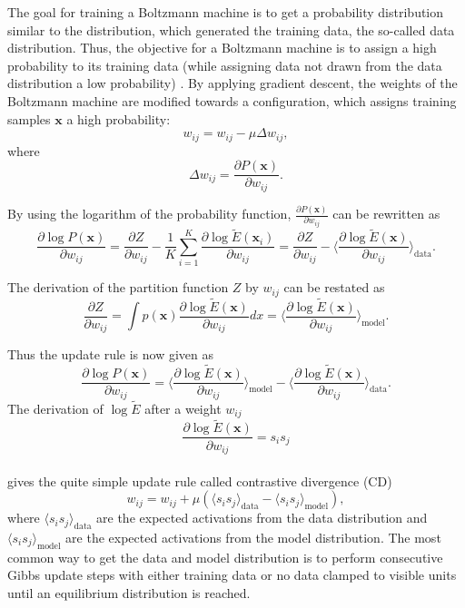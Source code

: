 The goal for training a Boltzmann machine is to get a probability distribution similar to the distribution, which generated the training data, the so-called data distribution.
Thus, the objective for a Boltzmann machine is to assign a high probability to its training data (while assigning data not drawn from the data distribution a low probability) \cite{ackley1985learning, Bengio2009, hinton2002training, Woodford2002}.
By applying gradient descent, the weights of the Boltzmann machine are modified towards a configuration, which assigns training samples $\textbf{x}$ a high probability:
\[
w_{ij} = w_{ij} - \mu \Delta w_{ij},
\]
where
\[
\Delta w_{ij} = \frac{\partial P(\textbf{x})}{\partial w_{ij}}.
\]

By using the logarithm of the probability function, $\frac{\partial P(\textbf{x})}{\partial w_{ij}}$ can be rewritten as
\[
\frac{\partial \log P(\textbf{x})}{\partial w_{ij}} = \frac{\partial Z}{\partial w_{ij}} - \frac{1}{K} \sum_{i=1}^K \frac{\partial \log \tilde{E}(\textbf{x}_i)}{\partial w_{ij}} =  \frac{\partial Z}{\partial w_{ij}} - \Big \langle \frac{\partial \log \tilde{E}(\textbf{x})}{\partial w_{ij}} \Big \rangle_{\text{data}}.
\]    

The derivation of the partition function $Z$ by $w_{ij}$ can be restated as
\[
 \frac{\partial Z}{\partial w_{ij}} = \int p(\textbf{x}) \frac{\partial \log \tilde{E}(\textbf{x})}{\partial w_{ij}} dx = \Big \langle \frac{\partial \log \tilde{E}(\textbf{x})}{\partial w_{ij}} \Big \rangle_{\text{model}}.
\]

Thus the update rule is now given as
\[
\frac{\partial \log P(\textbf{x})}{\partial w_{ij}} =  \Big \langle \frac{\partial \log \tilde{E}(\textbf{x})}{\partial w_{ij}} \Big \rangle_{\text{model}} - \Big \langle \frac{\partial \log \tilde{E}(\textbf{x})}{\partial w_{ij}} \Big \rangle_{\text{data}}.
\]
The derivation of $\log \tilde{E}$ after a weight $w_{ij}$
\[
\frac{\partial \log \tilde{E}(\textbf{x})}{\partial w_{ij}} = s_i s_j
\]
\\
gives the quite simple update rule called contrastive divergence (CD)
\[
w_{ij}= w_{ij} + \mu ( \langle s_i s_j \rangle_{\text{data}} - \langle s_i s_j \rangle_{\text{model}} ) ,
\]
where $\langle s_i s_j \rangle_{\text{data}}$ are the expected activations from the data distribution and  $ \langle s_i s_j \rangle_{\text{model}}$ are the expected activations from the model distribution.
The most common way to get the data and model distribution is to perform consecutive Gibbs update steps with either training data or no data clamped to visible units until an equilibrium distribution is reached.

